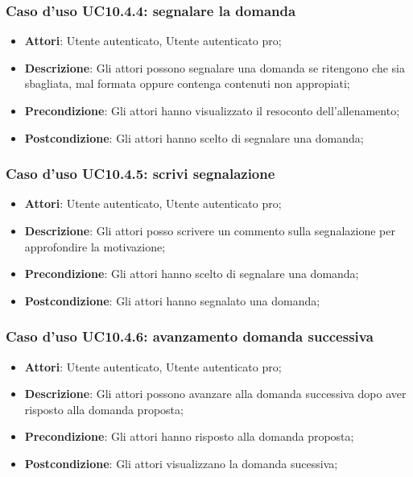 \subsubsection{Caso d'uso UC10.4.4: segnalare la domanda}
	\begin{itemize}
		\item \textbf{Attori}: Utente autenticato, Utente autenticato pro;
		\item \textbf{Descrizione}: Gli attori possono segnalare una domanda se ritengono che sia sbagliata, mal formata oppure contenga contenuti non appropiati;
		\item \textbf{Precondizione}: Gli attori hanno visualizzato il resoconto dell'allenamento;
		\item \textbf{Postcondizione}: Gli attori hanno scelto di segnalare una domanda;
	\end{itemize}
\subsubsection{Caso d'uso UC10.4.5: scrivi segnalazione}
	\begin{itemize}
		\item \textbf{Attori}: Utente autenticato, Utente autenticato pro;
		\item \textbf{Descrizione}: Gli attori posso scrivere un commento sulla segnalazione per approfondire la motivazione;
		\item \textbf{Precondizione}: Gli attori hanno scelto di segnalare una domanda;
		\item \textbf{Postcondizione}: Gli attori hanno segnalato una domanda;
	\end{itemize}
\subsubsection{Caso d'uso UC10.4.6: avanzamento domanda successiva}
	\begin{itemize}
		\item \textbf{Attori}: Utente autenticato, Utente autenticato pro;
		\item \textbf{Descrizione}: Gli attori possono avanzare alla domanda successiva dopo aver risposto alla domanda proposta; 
		\item \textbf{Precondizione}: Gli attori hanno risposto alla domanda proposta;
		\item \textbf{Postcondizione}: Gli attori visualizzano la domanda sucessiva;
	\end{itemize}
